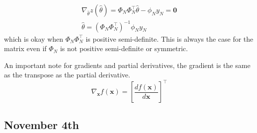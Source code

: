 \documentclass[11pt]{article}
\begin{document}
\begin{gather}
    \nabla_{\hat{\theta}} z(\hat{\theta}) = \Phi_N \Phi_N^\top \hat{\theta} - \phi_N y_N = \textbf{0} \\
    \hat{\theta} = (\Phi_N \Phi_N^\top)^{-1} \phi_N y_N 
\end{gather}
which is okay when $\Phi_N \Phi_N^\top$ is positive semi-definite.
This is always the case for the matrix even if $\Phi_N$ is not positive semi-definite or symmetric.


An important note for gradients and partial derivatives, the gradient is the same as the transpose as the partial derivative.
\begin{equation}
    \nabla_\textbf{x} f(\textbf{x}) = [\frac{d f(\textbf{x})}{d \textbf{x}}]^\top
\end{equation}

\subsection{November 4th}
\end{document}
